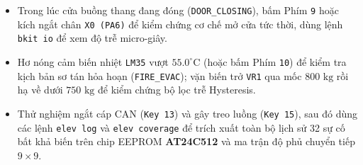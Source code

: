 \begin{enumerate}[nosep]
\begin{itemize}[nosep]
        \item Trong lúc cửa buồng thang đang đóng (\texttt{DOOR\_CLOSING}), bấm Phím \texttt{9} hoặc kích ngắt chân \texttt{X0 (PA6)} để kiểm chứng cơ chế mở cửa tức thời, dùng lệnh \texttt{bkit io} để xem độ trễ micro-giây.
        \item Hơ nóng cảm biến nhiệt \texttt{LM35} vượt $55.0^\circ\text{C}$ (hoặc bấm Phím \texttt{10}) để kiểm tra kịch bản sơ tán hỏa hoạn (\texttt{FIRE\_EVAC}); vặn biến trở \texttt{VR1} qua mốc $800\text{ kg}$ rồi hạ về dưới $750\text{ kg}$ để kiểm chứng bộ lọc trễ Hysteresis.
        \item Thử nghiệm ngắt cáp CAN (\texttt{Key 13}) và gây treo luồng (\texttt{Key 15}), sau đó dùng các lệnh \texttt{elev log} và \texttt{elev coverage} để trích xuất toàn bộ lịch sử 32 sự cố bất khả biến trên chip EEPROM \textbf{AT24C512} và ma trận độ phủ chuyển tiếp $9\times 9$.
    \end{itemize}
\end{enumerate}
